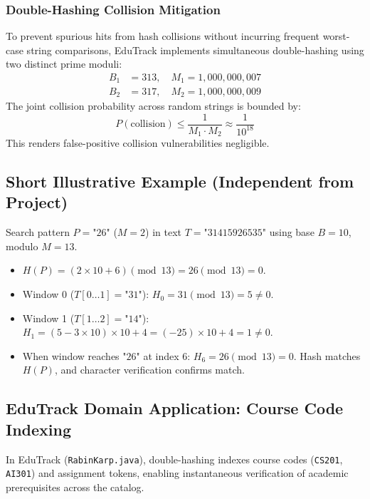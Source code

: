 \subsubsection{Double-Hashing Collision Mitigation}
To prevent spurious hits from hash collisions without incurring frequent worst-case string comparisons, EduTrack implements simultaneous double-hashing using two distinct prime moduli:
\begin{align}
B_1 &= 313, \quad M_1 = 1{,}000{,}000{,}007 \nonumber \\
B_2 &= 317, \quad M_2 = 1{,}000{,}000{,}009
\end{align}
The joint collision probability across random strings is bounded by:
\begin{equation}
P(\text{collision}) \le \frac{1}{M_1 \cdot M_2} \approx \frac{1}{10^{18}}
\end{equation}
This renders false-positive collision vulnerabilities negligible.

\subsection{Short Illustrative Example (Independent from Project)}
Search pattern $P = \text{"26"}$ ($M = 2$) in text $T = \text{"31415926535"}$ using base $B = 10$, modulo $M = 13$.
\begin{itemize}
    \item $H(P) = (2 \times 10 + 6) \pmod{13} = 26 \pmod{13} = 0$.
    \item Window 0 ($T[0 \dots 1] = \text{"31"}$): $H_0 = 31 \pmod{13} = 5 \ne 0$.
    \item Window 1 ($T[1 \dots 2] = \text{"14"}$): $H_1 = (5 - 3 \times 10) \times 10 + 4 = (-25) \times 10 + 4 = 1 \ne 0$.
    \item When window reaches $\text{"26"}$ at index 6: $H_6 = 26 \pmod{13} = 0$. Hash matches $H(P)$, and character verification confirms match.
\end{itemize}

\subsection{EduTrack Domain Application: Course Code Indexing}
In EduTrack (\texttt{RabinKarp.java}), double-hashing indexes course codes (\texttt{CS201}, \texttt{AI301}) and assignment tokens, enabling instantaneous verification of academic prerequisites across the catalog.

